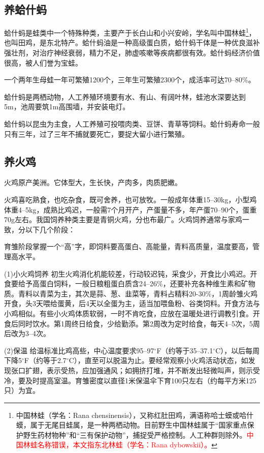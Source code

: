 \documentclass{ctexbook}
\begin{document}
\subsection{养蛤什蚂}
蛤什蚂是蛙类中一个特殊种类，主要产于长白山和小兴安岭，学名叫中国林蛙\footnote{中国林蛙（学名：Rana chensinensis），又称红肚田鸡，满语称哈士蟆或哈什蟆，属于无尾目蛙属，是一种两栖动物。目前野生中国林蛙属于“国家重点保护野生药材物种”和“三有保护动物”，捕捉受严格控制。人工种群则除外。\textcolor{red}{中国林蛙名称错误，本文指东北林蛙（学名：Rana dybowskii）。}}，也叫田鸡，是东北特产。蛤什蚂油是一种高级蛋白质，蛤什蚂干体是一种优良滋补强壮剂，对治疗神经衰弱，精力不足，肺虚咳嗽等疾病都很有效。蛤什蚂经济价值很高，被人们誉为宝蛙。

一个两年生母蛙一年可繁殖1200个，三年生可繁殖2300个，成活率可达70--80\%。

蛤什蚂是两栖动物，人工养殖环境要有水、有山、有阔叶林，蛙池水深要达到5m，池周要筑1m高围墙，并安装电灯。

蛤什蚂以昆虫为主食，人工养殖可投喂肉类、豆饼、青草等饲料。蛤什蚂寿命一般只有三年，过了三年不捕就要死亡，要捉大留小进行繁殖。
\subsection{养火鸡}
火鸡原产美洲。它体型大，生长快，产肉多，肉质肥嫩。

火鸡喜吃熟食，也吃杂食，既可舍养，也可放牧。一般成年体重15--30kg，小型鸡体重4--5kg，成熟比鸡迟，一般需7个月开产，产蛋量不多，年产蛋70--90个，蛋重70g左右。我国饲养种类主要是青铜火鸡，分也布最广。火鸡饲养通常与家鸡一致，分以下几个阶段：

育雏阶段掌握一个“高”字，即饲料要高蛋白、高能量，青料高质量，温度要高，管理高水平。

(1)小火鸡饲养 初生火鸡消化机能较差，行动较迟钝，采食少，开食比小鸡迟。开食要给予高蛋白饲料，一般日粮粗蛋白质含24--26\%，还要补充各种维生素和矿物质。青料以青菜为主，其次是蒜、葱、韭菜等，青料占精料20-30\%，1周龄雏火鸡开食，头3天喂给蛋黄，后4天以全蛋为主，适当加喂鱼粉、谷类饲料。开食方法与小鸡相似。有些小火鸡体质软弱，一时不肯吃食，应放在温暖处进行调教引食。开食后同时饮水。第1周终日给食，少给勤添。第2周改为定时给食，每天4--5次，5周后改为3--4次。

(2)保温 给温标准比鸡高些，中心温度要求95--97$^{\circ}$F（约等于35--37.1$^{\circ}$C），以后每周下降5$^{\circ}$F（约等于2.7$^{\circ}$C），直至可以脱温为止。要经常观察小火鸡活动状态，如发现张口扩翅，表示受热，应加强通风；如拥挤打堆，并不断发出轻微叫声，则示受冷，要及时提高室温。育雏密度以直径1米保温伞下育100只左右（约每平方米125只）为宜。
\end{document}
